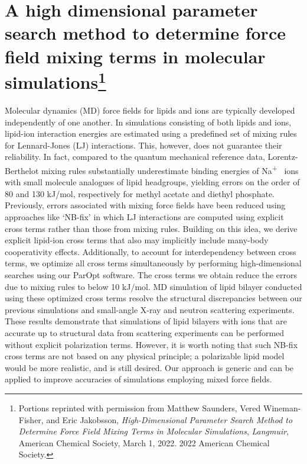\documentclass[12pt,openany,final]{book}
\newcommand{\na}{Na\textsuperscript{+}}
\begin{document}
\section{}

\chapter[A high dimensional parameter search method to...]{A high dimensional parameter search method to determine force field mixing terms in molecular simulations\footnote{
Portions reprinted with permission from Matthew Saunders, Vered Wineman-Fisher, and Eric Jakobsson, \textit{High-Dimensional Parameter Search Method to Determine Force Field Mixing Terms in Molecular Simulations}, 
\textit{Langmuir}, American Chemical Society, March 1, 2022. 
\textcopyright{} 2022 American Chemical Society.
}}
Molecular dynamics (MD) force fields for lipids and ions are typically developed independently of one another. 
In simulations consisting of both lipids and ions, 
lipid-ion interaction energies are estimated using a predefined 
set of mixing rules for Lennard-Jones (LJ) interactions. 
This, however, does not guarantee their reliability. 
In fact, compared to the quantum mechanical reference data, 
Lorentz-Berthelot mixing 
rules substantially underestimate binding energies of \na~ ions with small 
molecule analogues of lipid headgroups, yielding errors on the order of 80 and 130 kJ/mol, 
respectively for methyl acetate and diethyl phosphate. Previously, errors 
associated with mixing force fields have been reduced using approaches like `NB-fix' 
in which LJ interactions are computed using explicit cross terms rather than 
those from mixing rules. Building on this idea, we derive explicit 
lipid-ion cross terms that also may implicitly include many-body 
cooperativity effects.
Additionally, to account for interdependency between cross terms, 
we optimize all cross terms simultaneously by 
performing high-dimensional searches using our ParOpt software. 
The cross terms we obtain reduce the 
errors due to mixing rules to below 10 kJ/mol. 
MD simulation of lipid bilayer conducted using these 
optimized cross terms resolve the structural discrepancies between our previous
simulations and small-angle X-ray and neutron scattering experiments. 
These results demonstrate that simulations of lipid bilayers with ions that are 
accurate up to structural data from scattering experiments 
can be performed without explicit polarization terms. 
However, it is worth noting that such NB-fix cross terms are
not based on any physical principle; a polarizable lipid model would be more 
realistic, and is still desired. 
Our approach is generic and can be applied to 
improve accuracies of simulations employing mixed force fields.
\end{document}
